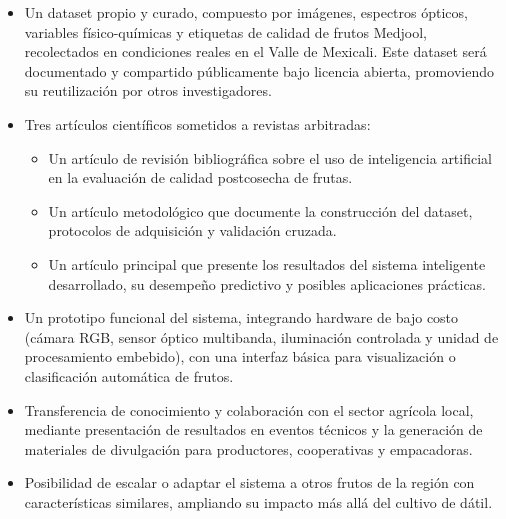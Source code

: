 \begin{itemize}
    \item Un dataset propio y curado, compuesto por imágenes, espectros ópticos, variables físico-químicas y etiquetas de calidad de frutos Medjool, recolectados en condiciones reales en el Valle de Mexicali. Este dataset será documentado y compartido públicamente bajo licencia abierta, promoviendo su reutilización por otros investigadores.
    \item Tres artículos científicos sometidos a revistas arbitradas:
    \begin{itemize}
        \item Un artículo de revisión bibliográfica sobre el uso de inteligencia artificial en la evaluación de calidad postcosecha de frutas.
        \item Un artículo metodológico que documente la construcción del dataset, protocolos de adquisición y validación cruzada.
        \item Un artículo principal que presente los resultados del sistema inteligente desarrollado, su desempeño predictivo y posibles aplicaciones prácticas.
    \end{itemize}
    \item Un prototipo funcional del sistema, integrando hardware de bajo costo (cámara RGB, sensor óptico multibanda, iluminación controlada y unidad de procesamiento embebido), con una interfaz básica para visualización o clasificación automática de frutos.
    \item Transferencia de conocimiento y colaboración con el sector agrícola local, mediante presentación de resultados en eventos técnicos y la generación de materiales de divulgación para productores, cooperativas y empacadoras.
    \item Posibilidad de escalar o adaptar el sistema a otros frutos de la región con características similares, ampliando su impacto más allá del cultivo de dátil.
\end{itemize}
